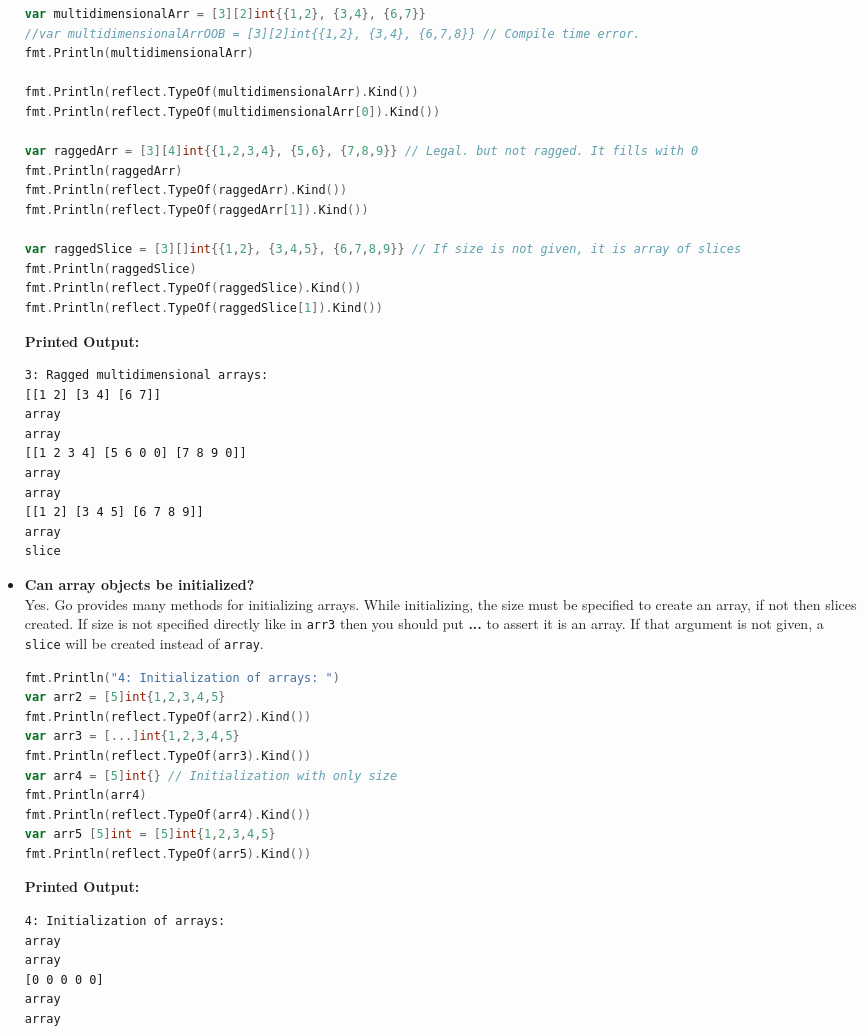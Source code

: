 \documentclass{article}
\begin{document}
\begin{itemize}
\begin{lstlisting}[language=GO]
var multidimensionalArr = [3][2]int{{1,2}, {3,4}, {6,7}}
//var multidimensionalArrOOB = [3][2]int{{1,2}, {3,4}, {6,7,8}} // Compile time error.
fmt.Println(multidimensionalArr)

fmt.Println(reflect.TypeOf(multidimensionalArr).Kind())
fmt.Println(reflect.TypeOf(multidimensionalArr[0]).Kind())

var raggedArr = [3][4]int{{1,2,3,4}, {5,6}, {7,8,9}} // Legal. but not ragged. It fills with 0
fmt.Println(raggedArr)
fmt.Println(reflect.TypeOf(raggedArr).Kind())
fmt.Println(reflect.TypeOf(raggedArr[1]).Kind())

var raggedSlice = [3][]int{{1,2}, {3,4,5}, {6,7,8,9}} // If size is not given, it is array of slices
fmt.Println(raggedSlice)
fmt.Println(reflect.TypeOf(raggedSlice).Kind())
fmt.Println(reflect.TypeOf(raggedSlice[1]).Kind())
\end{lstlisting}
\textbf{Printed Output:}
\begin{verbatim}
3: Ragged multidimensional arrays: 
[[1 2] [3 4] [6 7]]
array
array
[[1 2 3 4] [5 6 0 0] [7 8 9 0]]
array
array
[[1 2] [3 4 5] [6 7 8 9]]
array
slice
\end{verbatim}



\item \textbf{Can array objects be initialized?} \\  
Yes. Go provides many methods for initializing arrays. While initializing, the size must be specified to create an array, if not then slices created. If size is not specified directly like in \texttt{arr3} then you should put \textbf{...} to assert it is an array. If that argument is not given, a \texttt{slice} will be created instead of \texttt{array}.
\begin{lstlisting}[language=Go]
fmt.Println("4: Initialization of arrays: ")
var arr2 = [5]int{1,2,3,4,5}
fmt.Println(reflect.TypeOf(arr2).Kind())
var arr3 = [...]int{1,2,3,4,5}
fmt.Println(reflect.TypeOf(arr3).Kind())
var arr4 = [5]int{} // Initialization with only size
fmt.Println(arr4)
fmt.Println(reflect.TypeOf(arr4).Kind())
var arr5 [5]int = [5]int{1,2,3,4,5}
fmt.Println(reflect.TypeOf(arr5).Kind())
\end{lstlisting}
\textbf{Printed Output:}
\begin{verbatim}
4: Initialization of arrays: 
array
array
[0 0 0 0 0]
array
array
\end{verbatim}




\end{itemize}
\end{document}
